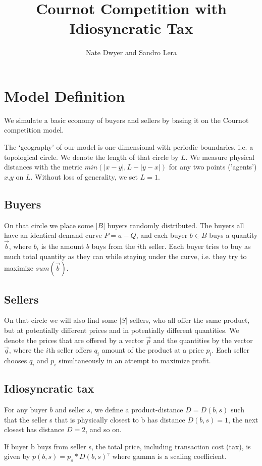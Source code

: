 \documentclass[14pt]{article}
\title{Cournot Competition with Idiosyncratic Tax}
\author{Nate Dwyer and Sandro Lera}
\begin{document}
\maketitle
\setcounter{section}{0}
\section{Model Definition}
We simulate a basic economy of buyers and sellers by basing it on the
Cournot competition model. 

The `geography' of our model is one-dimensional with periodic boundaries, 
i.e. a topological circle. We denote the length of that circle by $L$. We 
measure physical distances with the metric $min(|x-y|, L-|y-x|)$ for 
any two points ('agents') $x$,$y$ on $L$. Without loss of generality,
we set $L=1$. 

\subsection{Buyers}
On that circle we place some $|B|$ buyers randomly distributed. The buyers
all have an identical demand curve $P=a-Q$, and each buyer $b\in B$ buys a 
quantity $\vec{b}$, where $b_i$ is the amount $b$ buys from the $i$th
seller. Each buyer tries to buy as much total quantity as they can while
staying under the curve, i.e. they try to maximize $sum(\vec{b})$. 

\subsection{Sellers}
On that circle we will also find some $|S|$ sellers, who all offer the same
product, but at potentially different prices and in potentially different
quantities. We denote the prices that are offered by a vector $\vec{p}$ and 
the quantities by the vector $\vec{q}$, where the $i$th seller offers $q_i$
amount of the product at a price $p_i$. Each seller chooses $q_i$ and $p_i$ 
simultaneously in an attempt to maximize profit.  

\subsection{Idiosyncratic tax}
For any buyer $b$ and seller $s$, we define a product-distance $D = D(b,s)$ 
such that the seller s that is physically closest to b has distance 
$D(b,s)=1$, the next closest has distance $D=2$, and so on. 

If buyer b buys from seller s, the total price, including transaction cost
(tax), is given by $p(b,s) = p_s *  D(b,s)^\gamma$ where gamma is a 
scaling coefficient. 
\end{document}
